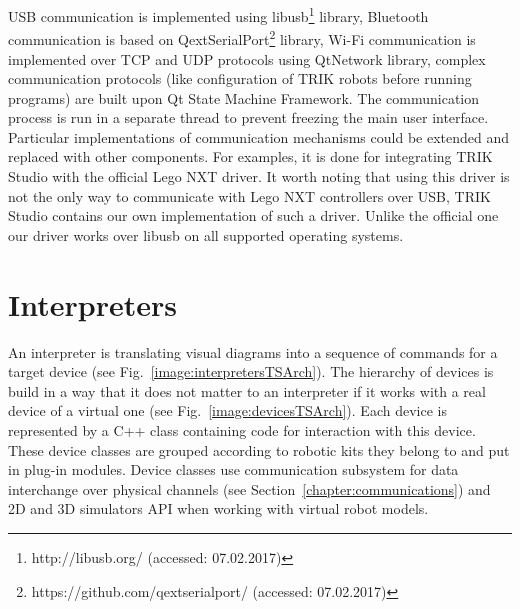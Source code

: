 \documentclass[conference]{IEEEtran}
\begin{document}
USB communication is implemented using libusb\footnote{http://libusb.org/ (accessed: 07.02.2017)} library, Bluetooth communication is based on QextSerialPort\footnote{https://github.com/qextserialport/ (accessed: 07.02.2017)} library, Wi-Fi communication is implemented over TCP and UDP protocols using QtNetwork library, complex communication protocols (like configuration of TRIK robots before running programs) are built upon Qt State Machine Framework. The communication process is run in a separate thread to prevent freezing the main user interface. Particular implementations of communication mechanisms could be extended and replaced with other components. For examples, it is done for integrating TRIK Studio with the official Lego NXT driver. It worth noting that using this driver is not the only way to communicate with Lego NXT controllers over USB, TRIK Studio contains our own implementation of such a driver. Unlike the official one our driver works over libusb on all supported operating systems.

\section{Interpreters}
\label{chapter:interpreters}

An interpreter is translating visual diagrams into a sequence of commands for a target device (see Fig.~\ref{image:interpretersTSArch}). The hierarchy of devices is build in a way that it does not matter to an interpreter if it works with a real device of a virtual one (see Fig.~\ref{image:devicesTSArch}). Each device is represented by a C++ class containing code for interaction with this device. These device classes are grouped according to robotic kits they belong to and put in plug-in modules. Device classes use communication subsystem for data interchange over physical channels (see Section~\ref{chapter:communications}) and 2D and 3D simulators API when working with virtual robot models. 
\end{document}

